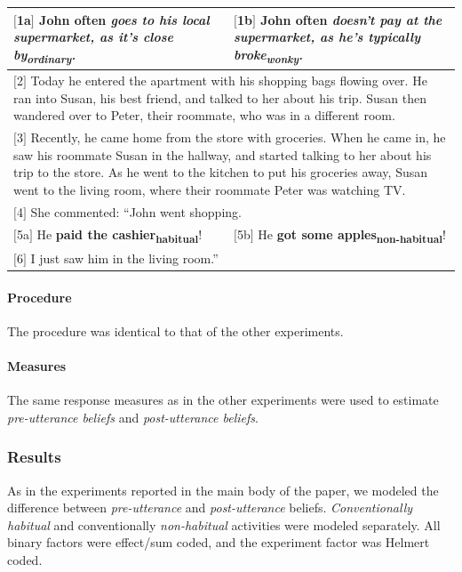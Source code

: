 \documentclass{sp}\usepackage[]{graphicx}\usepackage[]{color}
\begin{document}
\begin{longtable}{p{}|p{}}
$[$1a$]$ John often \textit{goes to his local supermarket, as it's close by\textsubscript{ordinary}.} & $[$1b$]$ John often \textit{doesn't pay at the supermarket, as he's typically broke\textsubscript{wonky}.}\\
\hline
\multicolumn{2}{p{0.9\textwidth}}{$[$2$]$ Today he entered the apartment with his shopping bags flowing over. He ran into Susan, his best friend, and talked to her about his trip. Susan then wandered over to Peter, their roommate, who was in a different room.} \\
\hline
\multicolumn{2}{p{0.9\textwidth}}{$[$3$]$ Recently, he came home from the store with groceries.  When he came in, he saw his roommate Susan in the hallway, and started talking to her about his trip to the store.  As he went to the kitchen to put his groceries away, Susan went to the living room, where their roommate Peter was watching TV.} \\
\hline
\multicolumn{2}{p{0.9\textwidth}}{\centering$[$4$]$ She commented: ``John went shopping.} \\
\hline
$[$5a$]$ He \textbf{paid the \mbox{cashier\textsubscript{habitual}}}! & $[$5b$]$ He \textbf{got some apples\textsubscript{non-habitual}}!\\
\hline
\multicolumn{2}{p{0.9\textwidth}}{\centering$[$6$]$ I just saw him in the living room.''}
\end{longtable}
\addtocounter{table}{-1}


\paragraph*{Procedure}

The procedure was identical to that of the other experiments. 

\paragraph*{Measures}

The same response measures as in the other experiments were used to estimate \textit{pre-utterance beliefs} and \textit{post-utterance beliefs}. 

\subsubsection{Results}

As in the experiments reported in the main body of the paper, we modeled the difference between \textit{pre-utterance} and \textit{post-utterance} beliefs. \textit{Conventionally habitual} and conventionally \textit{non-habitual} activities were modeled separately. All binary factors were effect/sum coded, and the experiment factor was Helmert coded.
\end{document}
